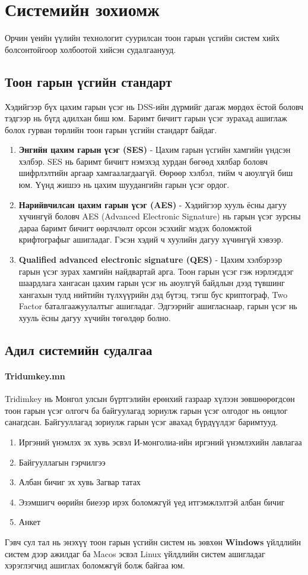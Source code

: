 \chapter{Системийн зохиомж}
Орчин үеийн үүлийн технологит суурилсан тоон гарын үсгийн систем хийх болсонтойгоор холбоотой хийсэн судалгаанууд.
\section{Тоон гарын үсгийн стандарт}
Хэдийгээр бүх цахим гарын үсэг нь DSS-ийн дүрмийг дагаж мөрдөх ёстой боловч тэдгээр нь бүгд адилхан биш юм. Баримт бичигт гарын үсэг зурахад ашиглаж болох гурван төрлийн тоон гарын үсгийн стандарт байдаг.
\begin{enumerate}
	\item \textbf{Энгийн цахим гарын үсэг (SES)} - Цахим гарын үсгийн хамгийн үндсэн хэлбэр. SES нь баримт бичигт нэмэхэд хурдан бөгөөд хялбар боловч шифрлэлтийн аргаар хамгаалагдаагүй. Өөрөөр хэлбэл, тийм ч аюулгүй биш юм. Үүнд жишээ нь цахим шуудангийн гарын үсэг ордог.
	\item \textbf{Нарийвчилсан цахим гарын үсэг (AES)} - Хэдийгээр хууль ёсны дагуу хүчингүй боловч AES (Advanced Electronic Signature) нь гарын үсэг зурсны дараа баримт бичигт өөрлчлөлт орсон эсэхийг мэдэх боломжтой крифтографыг ашигладаг. Гэсэн хэдий ч хуулийн дагуу хүчингүй хэвээр.
	\item \textbf{Qualified advanced electronic signature (QES)} - Цахим хэлбэрээр гарын үсэг зурах хамгийн найдвартай арга. Тоон гарын үсэг гэж нэрлэгддэг шаардлага хангасан цахим гарын үсэг нь аюулгүй байдлын дээд түвшинг хангахын тулд нийтийн түлхүүрийн дэд бүтэц, тэгш бус криптограф, Two Factor баталгаажуулалтыг ашигладаг. Эдгээрийг ашигласнаар, гарын үсэг нь хууль ёсны дагуу хүчийн төгөлдөр болно.
\end{enumerate}
\section{Адил системийн судалгаа}
\subsubsection{Tridumkey.mn}
Tridimkey нь Монгол улсын бүртгэлийн ерөнхий газраар хүлээн зөвшөөрөгдсөн тоон гарын үсэг олгогч ба байгуулагад зориулж гарын үсэг олгодог нь онцлог санагдсан. Байгууллагад зориулж гарын үсэг авахад бүрдүүлдэг баримтууд.
\begin{enumerate}
	\item Иргэний үнэмлэх эх хувь эсвэл И-монголиа-ийн иргэний  үнэмлэхийн лавлагаа
	\item Байгууллагын гэрчилгээ
	\item Албан бичиг эх хувь		Загвар татах
	\item Эзэмшигч өөрийн биеээр ирэх боломжгүй үед итгэмжлэлтэй албан бичиг
	\item Анкет
\end{enumerate}
Гэвч сул тал нь энэхүү тоон гарын үсгийн систем нь зөвхөн \textbf{Windows} үйлдлийн систем дээр ажилдаг ба Macos эсвэл Linux үйлдлийн систем ашигладаг хэрэглэгчид ашиглах боломжгүй болж байгаа юм.
